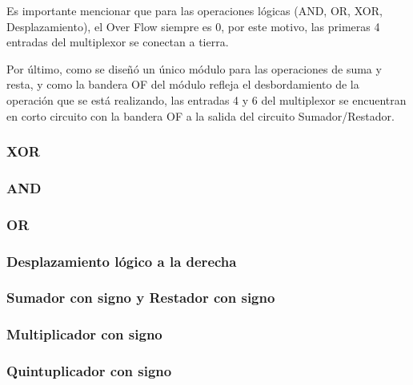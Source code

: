 \documentclass[journal,trans]{IEEEtran}
\begin{document}
Es importante mencionar que para las operaciones lógicas (AND, OR, XOR, Desplazamiento), el Over Flow siempre es 0, por este motivo, las primeras 4 entradas del multiplexor se conectan a tierra. 

Por último, como se diseñó un único módulo para las operaciones de suma y resta, y como la bandera OF del módulo refleja el desbordamiento de la operación que se está realizando, las entradas 4 y 6 del multiplexor se encuentran en corto circuito con la bandera OF a la salida del circuito Sumador/Restador.

\subsubsection{XOR}

\subsubsection{AND}

\subsubsection{OR}

\subsubsection{Desplazamiento lógico a la derecha}

\subsubsection{Sumador con signo y Restador con signo}

\subsubsection{Multiplicador con signo}

\subsubsection{Quintuplicador con signo}


\begin{comment}
Parte del problema por resolver consiste en el uso de componentes combinacionales, para lo cual se dispuso de un multiplexor de ocho entradas como el encargado de gobernar las operaciones.

se realizó una partición por módulos, lo cual consiste en estructurar la descripción del proyecto en secciones definidas, cada una con su respectivo proceso de diseño y codificación en el HDL Verilog.

Posteriormente se integró cada solución propuesta en un proyecto principal denominado main, al cual se le ajustaron los cambios correspondientes y se le agregó las distintas banderas como parte de las restricciones del proyecto.
\end{comment}
\end{document}
